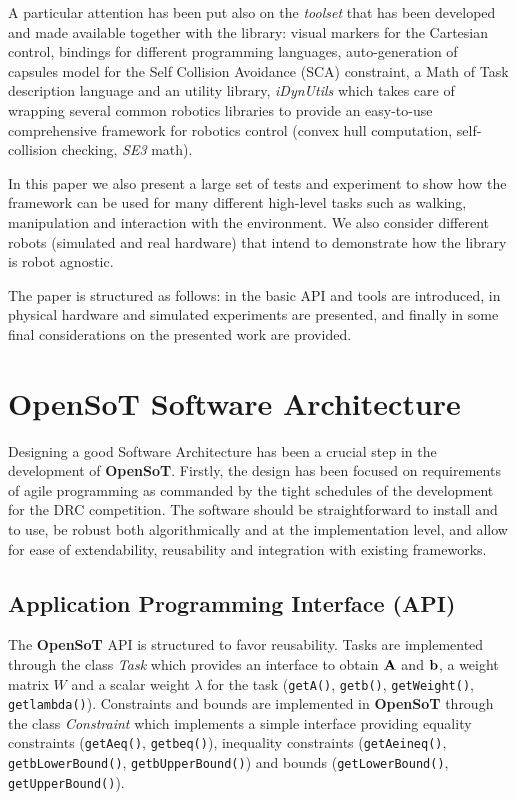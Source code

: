 A particular attention has been put also on the \emph{toolset} that has been developed and made available together with the library: visual markers for the Cartesian control, bindings for different programming languages, auto-generation of capsules model for the Self Collision Avoidance (SCA) constraint, a Math of Task description language and an utility library, \emph{iDynUtils} which takes care of wrapping several common robotics libraries to provide an easy-to-use comprehensive framework for robotics control (convex hull computation, self-collision checking, \emph{SE3} math). 

In this paper we also present a large set of tests and experiment to show how the framework can be used for many different high-level tasks such as walking, manipulation and interaction with the environment. We also consider different robots (simulated and real hardware) that intend to demonstrate how the library is robot agnostic.

The paper is structured as follows: in \textbf{} the basic API and tools are introduced, in \textbf{}physical hardware and simulated  experiments are presented, and finally in \textbf{} some final considerations on the presented work are provided.

\section{OpenSoT Software Architecture}
\label{sec:software_architecture}
Designing a good Software Architecture has been a crucial step in the development of \textbf{OpenSoT}. Firstly, the design has been focused on requirements of agile programming as commanded by the tight schedules of the development for the DRC competition. The software should be straightforward to install and to use, be robust both algorithmically and at the implementation level, and allow for ease of extendability, reusability and integration with existing frameworks.

\subsection{Application Programming Interface (API)}
The \textbf{OpenSoT} API is structured to favor reusability.
Tasks are implemented through the class \emph{Task} which provides an interface to obtain $\mathbf{A}$ and $\mathbf{b}$, a weight matrix $W$ and a scalar weight $\lambda$ for the task (\texttt{\small getA()}, \texttt{\small getb()}, \texttt{\small getWeight()}, \texttt{\small getlambda()}).
Constraints and bounds are implemented in \textbf{OpenSoT} through the class \emph{Constraint} which implements a simple interface providing equality constraints (\texttt{\small getAeq()}, \texttt{\small getbeq()}), inequality constraints (\texttt{\small getAeineq()}, \texttt{\small getbLowerBound()}, \texttt{\small getbUpperBound()}) and bounds (\texttt{\small getLowerBound()}, \texttt{\small getUpperBound()}).

